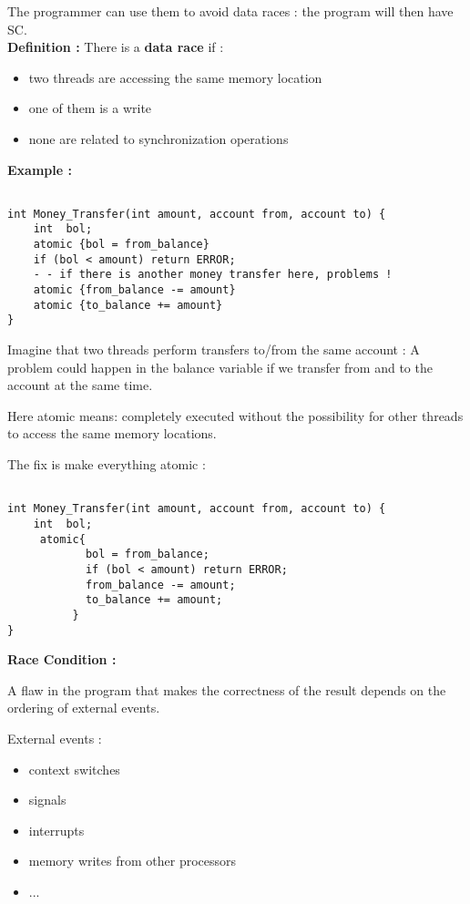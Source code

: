 \documentclass[a4paper,10pt]{article}
\begin{document}
The programmer can use them to avoid data races : the program will then have SC.\\

\textbf{Definition : } There is a \textbf{data race} if :
\begin{itemize}
\item two threads are accessing the same memory location
\item one of them is a write
\item none are related to synchronization operations
\end{itemize}

\vspace{5cm}

\textbf{Example :}

\begin{verbatim}

int Money_Transfer(int amount, account from, account to) {
	int  bol;
	atomic {bol = from_balance}
	if (bol < amount) return ERROR;
	- - if there is another money transfer here, problems !
	atomic {from_balance -= amount}
	atomic {to_balance += amount}
}

\end{verbatim}

Imagine that two threads perform transfers to/from the same account : A problem could happen in the balance variable if we transfer from and to the account at the same time.

Here atomic means: completely executed without the possibility for other threads to access the same memory locations.

The fix is make everything atomic :

\begin{verbatim}

int Money_Transfer(int amount, account from, account to) {
	int  bol;
     atomic{
            bol = from_balance;
            if (bol < amount) return ERROR;
            from_balance -= amount;
            to_balance += amount;
          }
}

\end{verbatim}


\textbf{Race Condition :}

A flaw in the program that makes the correctness of the result depends on the ordering of external events.

External events :
\begin{itemize}
\item context switches
\item signals
\item interrupts
\item memory writes from other processors
\item ...
\end{itemize}
\end{document}
